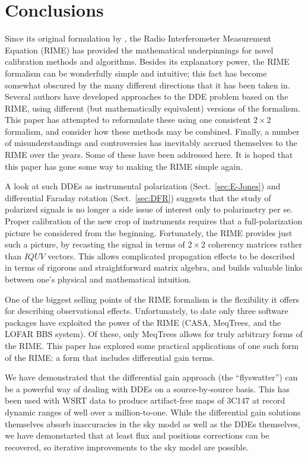 \documentclass[]{aa}
\begin{document}
\section{Conclusions}

Since its original formulation by \citet{ME1}, the Radio Interferometer Measurement Equation (RIME) has 
provided the mathematical underpinnings for novel calibration methods and algorithms. Besides its explanatory power, the RIME formalism can be wonderfully simple and intuitive; this fact has become somewhat obscured by the many different directions that it has been taken in. Several authors have developed approaches to the DDE problem based on the RIME, using different (but mathematically equivalent) versions of the formalism. This paper has attempted to reformulate these using one consistent $2\times2$ formalism, and consider how these methods may be combined. Finally, a number of misunderstandings and controversies has inevitably accrued themselves to the RIME over the years. Some of these have been addressed here. It is hoped that this paper has gone some way to making the RIME simple again. 

A look at such DDEs as instrumental polarization (Sect.~\ref{sec:E-Jones}) and differential Faraday rotation (Sect.~\ref{sec:DFR}) suggests that the study of polarized signals is no longer a side issue of interest only to polarimetry per se. Proper calibration of the new crop of instruments requires that a full-polarization picture be considered from the beginning. Fortunately, the RIME provides just such a picture, by recasting the signal in terms of $2\times2$ coherency matrices rather than $IQUV$ vectors. This allows complicated propagation effects to be described in terms of rigorous and straightforward matrix algebra, and builds valuable links between one's physical and mathematical intuition. 

One of the biggest selling points of the RIME formalism is the flexibility it offers for describing observational effects. Unfortunately, to date only three software packages have exploited the power of the RIME (CASA, MeqTrees, and the LOFAR BBS system). Of these, only MeqTrees allows for truly arbitrary forms of the RIME. This paper has explored some practical applications of one such form of the RIME: a form that includes differential gain terms.

We have demonstrated that the differential gain approach (the ``flyswatter'') can be a powerful way of dealing with DDEs on a source-by-source basis. This has been used with WSRT data to produce artifact-free maps of 3C147 at record dynamic ranges of well over a million-to-one. While the differential gain solutions themselves absorb inaccuracies in the sky model as well as the DDEs themselves, we have demonstarted that at least flux and positions corrections can be recovered, so iterative improvements to the sky model are possible. 
\end{document}
